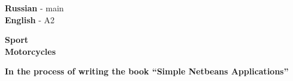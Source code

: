 

\begin{minipage}[t]{0.3\textwidth}
    \vspace{-\baselineskip} %


    \textbf{Russian} - main\\
    \textbf{English} - A2\\
\end{minipage}
\hfill
\begin{minipage}[t]{0.3\textwidth}
    \vspace{-\baselineskip} %


    \textbf{Sport} \\
    \textbf{Motorcycles}

\end{minipage}
\hfill
\begin{minipage}[t]{0.3\textwidth}
    \vspace{-\baselineskip} %


    \textbf{In the process of writing the book \enquote{Simple Netbeans Applications}}
\end{minipage}

